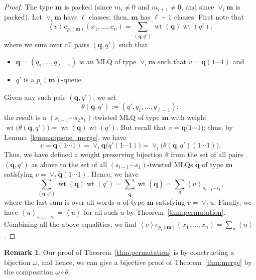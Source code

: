 \documentclass[reqno]{amsart}
\newcommand{\0}{\phantom{c}}
\newcommand{\swt}[1]{\left\langle #1 \right\rangle} %
\newcommand{\merge}[1]{\vee_{#1}} %
\DeclareMathOperator{\wt}{wt} %
\newcommand{\mm}{\mathbf{m}}
\newcommand{\qq}{\mathbf{q}}
\let\sumnonlimits\sum
\renewcommand{\sum}{\sumnonlimits\limits}
\newcommand{\tup}[1]{\left( #1 \right)}
\theoremstyle{plain}
\theoremstyle{definition}
\newtheorem{remark}[thm]{Remark}
\numberwithin{equation}{section}
\begin{document}
\begin{proof}
  The type $\mm$ is packed (since $m_i \neq 0$ and $m_{i+1} \neq 0$,
  and since $\merge{i}\mm$ is packed).
  Let $\merge{i}\mm$ have $\ell$ classes; then, $\mm$ has $\ell+1$
  classes.
  First note that
  \[
  \swt{v} e_{p_i(\mm)}(x_1, \dotsc, x_n) = \sum_{(\qq,q')} \wt(\qq) \wt(q'),
  \]
  where we sum over all pairs $(\qq, q')$ such that
  \begin{itemize}
  \item $\qq = (q_1, \dotsc, q_{\ell-1})$ is an MLQ of type $\merge{i}\mm$ such that $v = \qq(1\cdots1)$ and
  \item $q'$ is a $p_i(\mm)$-queue.
  \end{itemize}
  Given any such pair $\tup{\qq, q'}$, we set
  \[
  \theta(\qq, q') := (q', q_1, \dotsc, q_{\ell-1});
  \]
  the result is a $(s_{i-1} \dotsm s_2 s_1)$-twisted MLQ of type $\mm$ with weight
  $\wt\bigl( \theta(\qq, q') \bigr) = \wt(\qq) \wt(q')$.
  But recall that $v = \qq(1 \dotsm 1$); thus, by Lemma~\ref{lemma:queue_merge}, we have
  \[
  v = \qq(1 \dotsm 1) = \merge{i} \qq\bigl( q'(1 \dotsm 1) \bigr) = \merge{i} \bigl( \theta(\qq, q')(1 \dotsm 1) \bigr).
  \]
  Thus, we have defined a weight preserving bijection $\theta$ from the set of all pairs $(\qq, q')$ as above
  to the set of all $(s_{i-1} \dotsm s_1)$-twisted MLQs $\widetilde{\qq}$ of type $\mm$ satisfying $v = \merge{i} \widetilde{\qq} \tup{1 \dotsm 1}$.
  Hence, we have
  \[
  \sum_{(\qq,q')} \wt(\qq) \wt(q')
  = \sum_{\widetilde{\qq}} \wt(\widetilde{\qq})
  = \sum_u \swt{u}_{s_{i-1} \dotsm s_1} ,
  \]
  where the last sum is over all words $u$ of type $\mm$ satisfying $v = \merge{i} u$.
  Finally, we have $\swt{u}_{s_{i-1} \dotsm s_1} = \swt{u}$ for all such $u$ by Theorem~\ref{thm:permutation}.
  Combining all the above equalities, we find $\swt{v} e_{p_i(\mm)}(x_1, \dotsc, x_n) = \sum_u \swt{u}$.
\end{proof}

\begin{remark}
\label{rmk:bijective_proof}
Our proof of Theorem~\ref{thm:permutation} is by constructing a bijection $\omega$, and hence, we can give a bijective proof of Theorem~\ref{thm:merge} by the composition $\omega \circ \theta$.
\end{remark}
\end{document}
